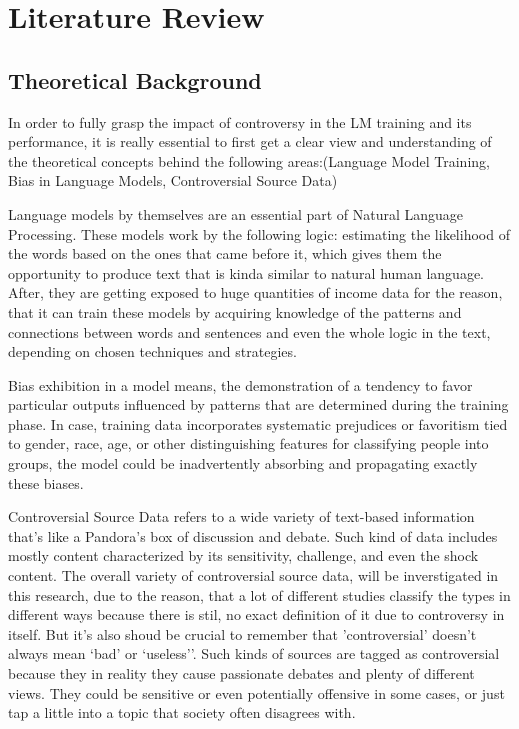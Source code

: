 \section{Literature Review}
\subsection{Theoretical Background}
In order to fully grasp the impact of controversy in the LM training and its performance, it is really essential to first get a clear view and understanding of the theoretical concepts behind the following areas:(Language Model Training, Bias in Language Models, Controversial Source Data)

Language models by themselves are an essential part of Natural Language Processing. These models work by the following logic: estimating the likelihood of the words based on the ones that came before it, which gives them the opportunity to produce text that is kinda similar to natural human language. After, they are getting exposed to huge quantities of income data for the reason, that it can train these models by acquiring knowledge of the patterns and connections between words and sentences and even the whole logic in the text, depending on chosen techniques and strategies. 

Bias exhibition in a model means, the demonstration of a tendency to favor particular outputs influenced by patterns that are determined during the training phase. In case, training data incorporates systematic prejudices or favoritism tied to gender, race, age, or other distinguishing features for classifying people into groups, the model could be inadvertently absorbing and propagating exactly these biases.\cite{TB2016}



Controversial Source Data refers to a wide variety of text-based information that’s like a Pandora's box of discussion and debate. Such kind of data includes mostly content characterized by its sensitivity, challenge, and even the shock content. The overall variety of controversial source data, will be inverstigated in this research, due to the reason, that a lot of different studies classify the types in different ways because there is stil, no exact definition of it due to controversy in itself.\cite{dh2016} But it's also shoud be crucial to remember that 'controversial' doesn't always mean ‘bad’ or ‘useless’’. Such kinds of sources are tagged as  controversial because they in reality they cause passionate debates and plenty of different views. They could be sensitive or even potentially offensive in some cases, or just tap a little into a topic that society often disagrees with.

